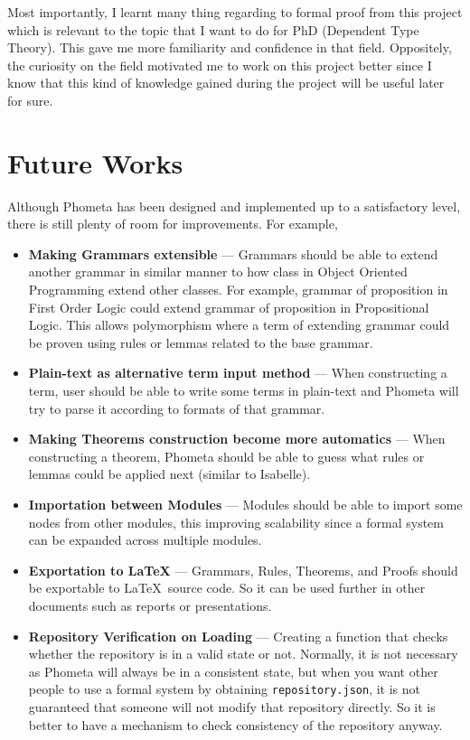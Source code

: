 \documentclass[master.tex]{subfiles}
\begin{document}
Most importantly, I learnt many thing regarding to formal proof from this
project which is relevant to the topic that I want to do for PhD (Dependent Type
Theory). This gave me more familiarity and confidence in that field. Oppositely,
the curiosity on the field motivated me to work on this project better since I
know that this kind of knowledge gained during the project will be useful later
for sure.

\section{Future Works}
\label{sec:future_work}

Although Phometa has been designed and implemented up to a satisfactory level,
there is still plenty of room for improvements. For example,
\begin{itemize}
\item \textbf{Making Grammars extensible} --- Grammars should be able to extend another
  grammar in similar manner to how class in Object Oriented Programming extend
  other classes. For example, grammar of proposition in First Order Logic could
  extend grammar of proposition in Propositional Logic. This allows polymorphism
  where a term of extending grammar could be proven using rules or lemmas
  related to the base grammar.
\item \textbf{Plain-text as alternative term input method} --- When constructing
  a term, user should be able to write some terms in plain-text and Phometa will
  try to parse it according to formats of that grammar.
\item \textbf{Making Theorems construction become more automatics} --- When
  constructing a theorem, Phometa should be able to guess what rules or lemmas
  could be applied next (similar to Isabelle).
\item \textbf{Importation between Modules} --- Modules should be able to import some
  nodes from other modules, this improving scalability since a formal system can
  be expanded across multiple modules.
\item \textbf{Exportation to \LaTeX} --- Grammars, Rules, Theorems, and Proofs
  should be exportable to \LaTeX\ source code. So it can be used further in
  other documents such as reports or presentations.
\item \textbf{Repository Verification on Loading} --- Creating a function that
  checks whether the repository is in a valid state or not. Normally, it is not
  necessary as Phometa will always be in a consistent state, but when you want
  other people to use a formal system by obtaining \texttt{repository.json}, it
  is not guaranteed that someone will not modify that repository directly. So it
  is better to have a mechanism to check consistency of the repository anyway.
\end{itemize}
\end{document}
